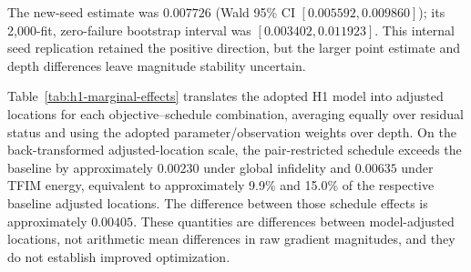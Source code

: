 \documentclass[pdflatex,sn-mathphys-num,Numbered]{sn-jnl}
\begin{document}
The new-seed estimate was $0.007726$ (Wald 95\% CI $[0.005592,0.009860]$); its 2,000-fit, zero-failure bootstrap interval was $[0.003402,0.011923]$. This internal seed replication retained the positive direction, but the larger point estimate and depth differences leave magnitude stability uncertain.

Table~\ref{tab:h1-marginal-effects} translates the adopted H1 model into adjusted locations for each objective--schedule combination, averaging equally over residual status and using the adopted parameter/observation weights over depth. On the back-transformed adjusted-location scale, the pair-restricted schedule exceeds the baseline by approximately $0.00230$ under global infidelity and $0.00635$ under TFIM energy, equivalent to approximately 9.9\% and 15.0\% of the respective baseline adjusted locations. The difference between those schedule effects is approximately $0.00405$. These quantities are differences between model-adjusted locations, not arithmetic mean differences in raw gradient magnitudes, and they do not establish improved optimization.
\end{document}
